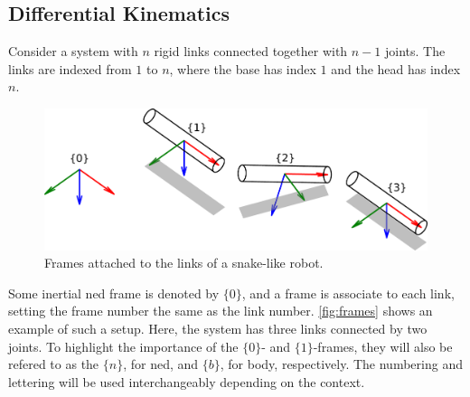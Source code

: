 \subsection{Differential Kinematics}
\label{sec:diff_kin}


Consider a system with $n$ rigid links connected together with $n-1$ joints. The
links are indexed from $1$ to $n$, where the base
has index $1$ and the head has index $n$.
\begin{figure}[h!]
    \centering
    \includegraphics[width=\textwidth]{assets/frames_thin.pdf}
    \caption{Frames attached to the links of a snake-like robot.}
    \label{fig:frames}
\end{figure}
Some inertial \gls{ned} frame is denoted by $\{0\}$, and a frame is associate to each link,
setting the frame number the same as the link number.
\autoref{fig:frames} shows an example of such a setup. Here, the system has
three links connected by two joints. To highlight the importance of the $\{0\}$-
and $\{1\}$-frames, they will also be refered to as the $\{n\}$, for \gls{ned}, and
$\{b\}$, for body, respectively. The numbering and lettering will be used interchangeably
depending on the context.

